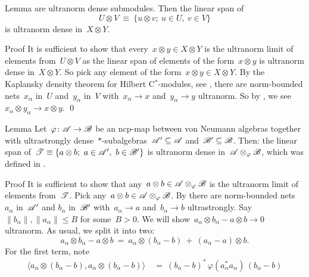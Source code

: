 \documentclass[b]{subfiles}
\begin{document}
\begin{parsec}
\begin{point}{Lemma}
    are ultranorm dense submodules.
Then the linear span of
\begin{equation*}
    U \otimes V \ \equiv\  \{ u \otimes v;\  u \in U,\ v \in V\}
\end{equation*}
is ultranorm dense in~$X \otimes Y$.
\begin{point}{Proof}%
It is sufficient to show that every~$x \otimes y \in X \otimes Y$
    is the ultranorm limit of elements from~$U \otimes V$
    as the linear span of elements of the form~$x \otimes y$
    is ultranorm dense in~$X \otimes Y$.
So pick any element of the form~$x \otimes y \in X \otimes Y$.
By the Kaplansky density theorem for Hilbert C$^*$-modules,
 see ,
    there are norm-bounded nets~$x_\alpha$ in~$U$
    and~$y_\alpha$ in~$V$
    with~$x_\alpha \to x$ and~$y_\alpha \to y$ ultranorm.
So by ,
    we see~$x_\alpha \otimes y_\alpha \to x \otimes y$. \qed
\end{point}
\end{point}
\begin{point}{Lemma}%
Let~$\varphi \colon \mathscr{A} \to \mathscr{B}$ be an ncp-map between von Neumann algebras
    together with ultrastrongly
    dense~$*$-subalgebras~$\mathscr{A}' \subseteq \mathscr{A}$
        and~$\mathscr{B}' \subseteq \mathscr{B}$.
Then: the linear span
    of~$ \mathscr{T}  \equiv \{ a \otimes b;\ a \in \mathscr{A}', \ b\in \mathscr{B}'\}$
is ultranorm dense in~$\mathscr{A} \otimes_\varphi \mathscr{B}$,
which was defined in  .
\begin{point}{Proof}%
It is sufficient to show that any~$a\otimes b \in \mathscr{A} \otimes_\varphi \mathscr{B}$
    is the ultranorm limit of elements from~$\mathscr{T}$.
    Pick any~$a\otimes b\in \mathscr{A} \otimes_\varphi \mathscr{B}$.
By 
    there are norm-bounded nets~$a_\alpha$ in~$\mathscr{A}'$ and
    $b_\alpha$ in~$\mathscr{B}'$
    with~$a_\alpha \to a$ and~$b_\alpha \to b$ ultrastrongly.
Say~$\|b_\alpha \|, \|a_\alpha\| \leq B$ for some~$B > 0$.
We will show~$a_\alpha \otimes b_\alpha - a\otimes b \to 0$ ultranorm.
As usual, we split it into two:
\begin{equation*}
a_\alpha \otimes b_\alpha - a \otimes b
\ = \ a_\alpha \otimes(b_\alpha -b )\  +\  (a_\alpha - a) \otimes b.
\end{equation*}
For the first term, note
\begin{align*}
    \langle a_\alpha \otimes (b_\alpha  - b),
    a_\alpha \otimes (b_\alpha  - b) \rangle
    & \ = \ 
    (b_\alpha - b)^* \,\varphi (a_\alpha^* a_\alpha) \,(b_\alpha - b) \\

\end{align*}
\end{point}
\end{point}
\end{parsec}
\end{document}
